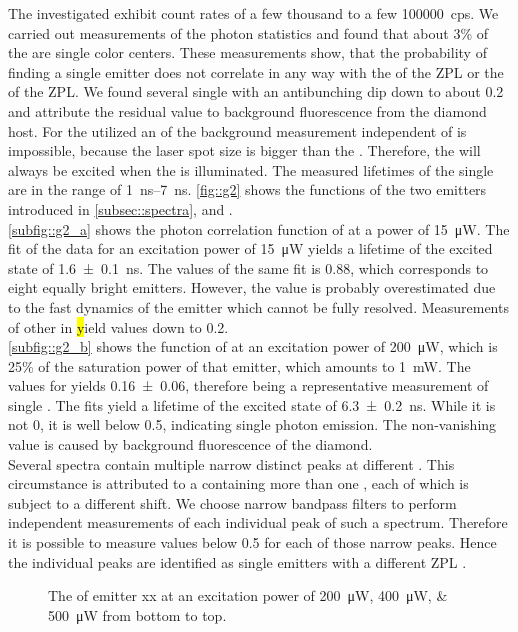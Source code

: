 	The investigated \sivs exhibit count rates of a few thousand to a few \SI{100000}{cps}.
	We carried out measurements of the photon statistics and found that about 3\% of the \sivs are single color centers.
	These measurements show, that the probability of finding a single emitter does not correlate in any way with the \cwl of the ZPL or the \lw of the ZPL.
	We found several single \sivs with an antibunching dip down to about \num{0.2} and attribute the residual \gtz value to background fluorescence from the diamond host.
	For the utilized \nds an of the background measurement independent of \siv \pl is impossible, because the laser spot size is bigger than the \nd. 
	Therefore, the \siv will always be excited when the \nd is illuminated.
	The measured lifetimes of the single \sivs are in the range of \SIrange{1}{7}{ns}.
	\autoref{fig::g2} shows the \gt functions of the two emitters introduced in \autoref{subsec::spectra}, \emnarrow and \embroad.
	\\
	\autoref{subfig::g2_a} shows the photon correlation function of \emnarrow at a power of \SI{15}{\micro\W}. 
	The fit of the data for an excitation power of \SI{15}{\micro\W} yields a lifetime of the excited state of \SI[separate-uncertainty]{1.6\pm0.1}{ns}.
	The \gtz values of the same fit is \num{0.88}, which corresponds to eight equally bright emitters.
	However, the \gtz value is probably overestimated due to the fast dynamics of the emitter which cannot be fully resolved.
	Measurements of other \sivs in \hl yield \gtz values down to \num[separate-uncertainty]{0.2}.
	\\
	\autoref{subfig::g2_b} shows the \gt function of \embroad at an excitation power of \SI{200}{\micro\W}, which is 25\% of the saturation power of that emitter, which amounts to \SI{1}{mW}.
	The \gtz values for yields \num[separate-uncertainty]{0.16\pm0.06}, therefore being a representative \gt measurement of single \sivs.
	The fits yield a lifetime of the excited state of \SI[separate-uncertainty]{6.3\pm0.2}{ns}.
	While it is not 0, it is well below \num{0.5}, indicating single photon emission.
	The non-vanishing \gtz value is caused by background fluorescence of the diamond.
	\\
	Several spectra contain multiple narrow distinct peaks at different \ZPL \cwls.
	This circumstance is attributed to a \nd containing more than one \siv, each of which is subject to a different \cwl shift.
	We choose narrow bandpass filters to perform independent measurements of each individual \siv peak of such a spectrum.
	Therefore it is possible to measure \gtz values below \num{0.5} for each of those narrow peaks.
	Hence the individual peaks are identified as single emitters with a different ZPL \cwl.
	\\
	\begin{figure}[tp]
		\centering
		\caption{The \gtf of emitter xx at an excitation power of \SIlist{200;400;500}{\micro\watt} from bottom to top.}
		\label{fig::g2_powerdependent}
	\end{figure}


